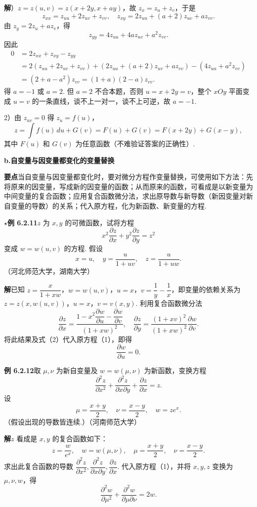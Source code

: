 \documentclass[UTF8, 12pt, fontset=fandol, oneside]{ctexart}
\begin{document}
\noindent\textbf{解}）$z=z(u,v)=z(x+2y,x+ay)$，故 $z_x=z_u+z_v$，于是
\[
  z_{xx}=z_{uu}+2z_{uv}+z_{vv},\quad
  z_{xy}=2z_{uu}+(a+2)z_{uv}+az_{vv}.
\]
由 $z_y=2z_u+az_v$，得
\[
  z_{yy}=4z_{uu}+4az_{uv}+a^2z_{vv}.
\]
因此
\[
\begin{aligned}
0&=2z_{xx}+z_{xy}-z_{yy}\\
&=2(z_{uu}+2z_{uv}+z_{vv})+(2z_{uu}+(a+2)z_{uv}+az_{vv})-(4z_{uu}+a^2z_{vv})\\
&=(2+a-a^2)z_{vv}=(1+a)(2-a)z_{vv}.
\end{aligned}
\]
得 $a=-1$ 或 $a=2$. 但 $a=2$ 不合本题，否则 $u=x+2y=v$，整个 $xOy$ 平面变成 $u=v$ 的一条直线，谈不上一对一，谈不上可逆，故 $a=-1$.

2）由 $z_{uv}=0$ 得 $z_u=f(u)$，
\[
  z=\int f(u)\,du+G(v)=F(u)+G(v)=F(x+2y)+G(x-y),
\]
其中 $F(u)$ 和 $G(v)$ 为任意函数（不难验证答案的正确性）.

\noindent\textbf{b.\quad 自变量与因变量都变化的变量替换}

\noindent\textbf{要点}\quad 当自变量与因变量都变化时，要对微分方程作变量替换，可使用如下方法：先将原来的因变量，写成新的因变量的函数；从而原来的函数，可看成是以新变量为中间变量的复合函数；应用复合函数微分法，求出原导数与新导数（新因变量对新自变量的导数）的关系；代入原方程，化为新函数、新变量的方程.

\noindent\textbf{\ensuremath{\star}例 6.2.11}\quad $z$ 为 $x,y$ 的可微函数，试将方程
\[
  x^2\frac{\partial z}{\partial x}+y^2\frac{\partial z}{\partial y}=z^2 \tag{1}
\]
变成 $w=w(u,v)$ 的方程. 假设
\[
  x=u,\quad y=\frac{u}{1+uv},\quad z=\frac{u}{1+uw}. \tag{2}
\]
（河北师范大学，湖南大学）

\noindent\textbf{解}\quad 已知 $z=\dfrac{x}{1+xw}$，$w=w(u,v)$，$u=x$，$v=\dfrac1y-\dfrac1x$，即变量的依赖关系为 $z=z(x,w(u,v))$，$u=x$，$v=v(x,y)$.
利用复合函数微分法
\[
  \frac{\partial z}{\partial x}
  =\frac{1-x^2\dfrac{\partial w}{\partial u}-\dfrac{\partial w}{\partial v}}{(1+xw)^2},\quad
  \frac{\partial z}{\partial y}
  =\frac{(1+xv)^2}{(1+xw)^2}\frac{\partial w}{\partial v}.
\]
将此结果及式（2）代入原方程（1），即得
\[
  \frac{\partial w}{\partial u}=0.
\]

\noindent\textbf{例 6.2.12}\quad 取 $\mu,\nu$ 为新自变量及 $w=w(\mu,\nu)$ 为新函数，变换方程
\[
  \frac{\partial^2z}{\partial x^2}+\frac{\partial^2z}{\partial x\partial y}+\frac{\partial z}{\partial x}=z. \tag{1}
\]
设
\[
  \mu=\frac{x+y}{2},\quad \nu=\frac{x-y}{2},\quad w=ze^x. \tag{2}
\]
（假设出现的导数皆连续.）（河南师范大学）

\noindent\textbf{解}\quad $z$ 看成是 $x,y$ 的复合函数如下：
\[
  z=\frac{w}{e^x},\quad w=w(\mu,\nu),\quad \mu=\frac{x+y}{2},\quad \nu=\frac{x-y}{2}.
\]
求出此复合函数的导数 $\dfrac{\partial^2z}{\partial x^2},\dfrac{\partial^2z}{\partial x\partial y},\dfrac{\partial z}{\partial x}$. 代入原方程（1），并将 $x,y,z$ 变换为 $\mu,\nu,w$，得
\[
  \frac{\partial^2w}{\partial \mu^2}+\frac{\partial^2w}{\partial \mu\partial\nu}=2w.
\]
\end{document}
